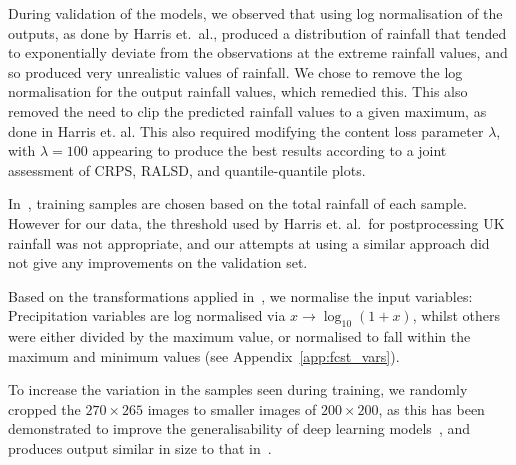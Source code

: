 \documentclass{article}
\begin{document}

During validation of the models, we observed that using log normalisation of the outputs, as done by Harris et.~al., produced a distribution of rainfall that tended to exponentially deviate from the observations at the extreme rainfall values, and so produced very unrealistic values of rainfall. We chose to remove the log normalisation for the output rainfall values, which remedied this. This also removed the need to clip the predicted rainfall values to a given maximum, as done in Harris et. al. This also required modifying the content loss parameter $\lambda$, with $\lambda=100$ appearing to produce the best results according to a joint assessment of CRPS, RALSD, and quantile-quantile plots.


In~\cite{harris_generative_2022}, training samples are chosen based on the total rainfall of each sample. However for our data, the threshold used by Harris et. al.~for postprocessing UK rainfall was not appropriate, and our attempts at using a similar approach did not give any improvements on the validation set.

Based on the transformations applied in~\cite{harris_generative_2022}, we normalise the input variables: Precipitation variables are log normalised via $x \to \log_{10}(1 + x)$, whilst others were either divided by the maximum value, or normalised to fall within the maximum and minimum values (see Appendix~\ref{app:fcst_vars}).

To increase the variation in the samples seen during training, we randomly cropped the $270 \times 265$ images to smaller images of $200 \times 200$, as this has been demonstrated to improve the generalisability of deep learning models~\citep{goodfellow_deep_2016}, and produces output similar in size to that in~\cite{harris_generative_2022}.
\end{document}
